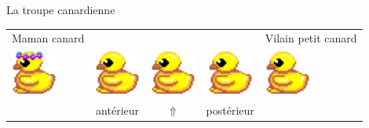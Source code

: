 \documentclass[table]{beamer}
\begin{document}
\begin{frame}{La troupe canardienne}

    \begin{center}
    \begin{tabular}{p{1.5cm} c c c p{1.5cm}}
        Maman canard &&&& \footnotesize Vilain petit canard \\
        \includegraphics[width=1.5cm]{img/sprite/ducks/duck_W_1.png} &
        \includegraphics[width=1.5cm]{img/sprite/ducks/duckling_W_1.png} &
        \includegraphics[width=1.5cm]{img/sprite/ducks/duckling_W_1.png} &
        \includegraphics[width=1.5cm]{img/sprite/ducks/duckling_W_1.png} &
        \includegraphics[width=1.5cm]{img/sprite/ducks/duckling_W_1.png} \\
        & antérieur &  $\Uparrow$   & postérieur &
        
    \end{tabular}
    \end{center}

\end{frame}
\end{document}
